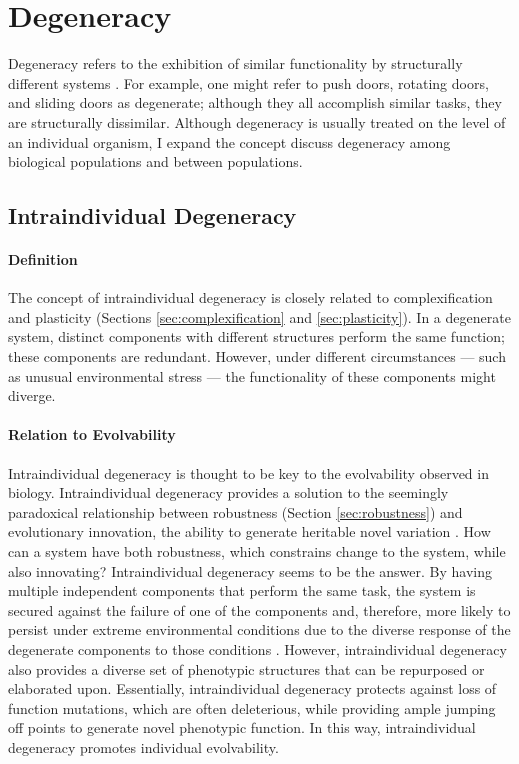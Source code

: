 \section{Degeneracy} \label{sec:degeneracy}

Degeneracy refers to the exhibition of similar functionality by structurally different systems  \cite{Edelman2001DegeneracySystems}. For example, one might refer to push doors, rotating doors, and sliding doors as degenerate; although they all accomplish similar tasks, they are structurally dissimilar. Although degeneracy is usually treated on the level of an individual organism, I expand the concept discuss degeneracy among biological populations and between populations.

\subsection{Intraindividual Degeneracy}

\paragraph{Definition}
The concept of intraindividual degeneracy is closely related to complexification and plasticity (Sections \ref{sec:complexification} and \ref{sec:plasticity}). In a degenerate system, distinct components with different structures perform the same function; these components are redundant. However, under different circumstances --- such as unusual environmental stress --- the functionality of these components might diverge. \cite{Richter2015EvolvabilitySurvey}

\paragraph{Relation to Evolvability}
Intraindividual degeneracy is thought to be key to the evolvability observed in biology. Intraindividual degeneracy provides a solution to the seemingly paradoxical relationship between robustness (Section \ref{sec:robustness}) and evolutionary innovation, the ability to generate heritable novel variation \cite{Whitacre2010Degeneracy:Evolvability}.\mindmapmark{\individualevolvabilityrobustness}\mindmapmark{\individualevolvabilityrobustnessintraindividualdegeneracy} How can a system have both robustness, which constrains change to the system, while also innovating? Intraindividual degeneracy seems to be the answer. By having multiple independent components that perform the same task, the system is secured against the failure of one of the components and, therefore, more likely to persist under extreme environmental conditions due to the diverse response of the degenerate components to those conditions \cite{Whitacre2010Degeneracy:Evolvability}.\mindmapmark{\robustnessintraindividualdegeneracy} However, intraindividual degeneracy also provides a diverse set of phenotypic structures that can be repurposed or elaborated upon. Essentially, intraindividual degeneracy protects against loss of function mutations, which are often deleterious, while providing ample jumping off points to generate novel phenotypic function. In this way, intraindividual degeneracy promotes individual evolvability. \mindmapmark{\individualevolvabilityintraindividualdegeneracy}

